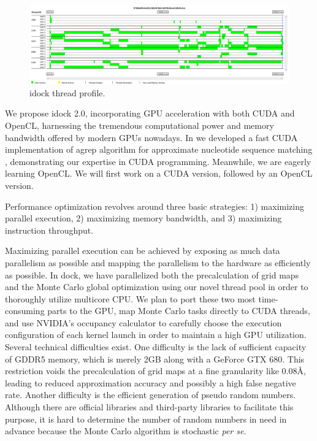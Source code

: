 \begin{figure}
\centering
\includegraphics[width=\textwidth]{idock/ThreadProfile.png}
\caption{idock thread profile.}
\label{idock:ThreadProfile}
\end{figure}

We propose idock 2.0, incorporating GPU acceleration with both CUDA and OpenCL, harnessing the tremendous computational power and memory bandwidth offered by modern GPUs nowadays. In \citeyear{1138} we developed a fast CUDA implementation of agrep algorithm for approximate nucleotide sequence matching \citep{1138}, demonstrating our expertise in CUDA programming. Meanwhile, we are eagerly learning OpenCL. We will first work on a CUDA version, followed by an OpenCL version.

Performance optimization revolves around three basic strategies: 1) maximizing parallel execution, 2) maximizing memory bandwidth, and 3) maximizing instruction throughput.

Maximizing parallel execution can be achieved by exposing as much data parallelism as possible and mapping the parallelism to the hardware as efficiently as possible. In dock, we have parallelized both the precalculation of grid maps and the Monte Carlo global optimization using our novel thread pool in order to thoroughly utilize multicore CPU. We plan to port these two most time-consuming parts to the GPU, map Monte Carlo tasks directly to CUDA threads, and use NVIDIA's occupancy calculator to carefully choose the execution configuration of each kernel launch in order to maintain a high GPU utilization. Several technical difficulties exist. One difficulty is the lack of sufficient capacity of GDDR5 memory, which is merely 2GB along with a GeForce GTX 680. This restriction voids the precalculation of grid maps at a fine granularity like 0.08\AA, leading to reduced approximation accuracy and possibly a high false negative rate. Another difficulty is the efficient generation of pseudo random numbers. Although there are official libraries and third-party libraries to facilitate this purpose, it is hard to determine the number of random numbers in need in advance because the Monte Carlo algorithm is stochastic \textit{per se}.

